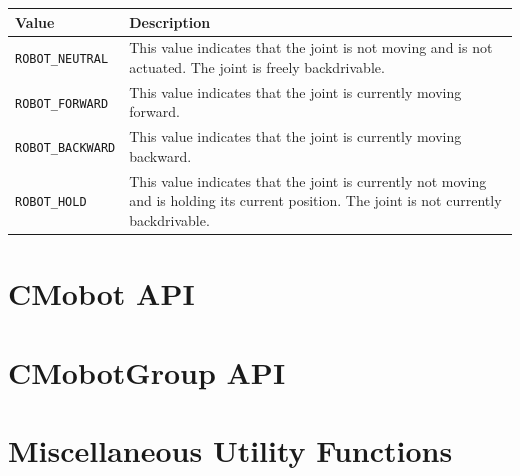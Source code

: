 \documentclass{article}
\begin{document}
\begin{tabular}{p{3.3cm}p{11.5cm}} \hline 
Value & Description \\
\hline
\texttt{ROBOT\_NEUTRAL}& This value indicates that the joint is not moving and is not actuated. The joint is freely backdrivable. \\
\texttt{ROBOT\_FORWARD}& This value indicates that the joint is currently moving forward. \\
\texttt{ROBOT\_BACKWARD}& This value indicates that the joint is currently moving backward. \\
\texttt{ROBOT\_HOLD}& This value indicates that the joint is currently not moving and is holding its current position. The joint is not currently backdrivable. \\
\hline
\end{tabular}

\section{\label{sec:cmobot_api}CMobot API}


\section{\label{sec:cmobotgroup_api}CMobotGroup API}


\section{\label{sec:utility_functions}Miscellaneous Utility Functions}

\printindex
\end{document}
